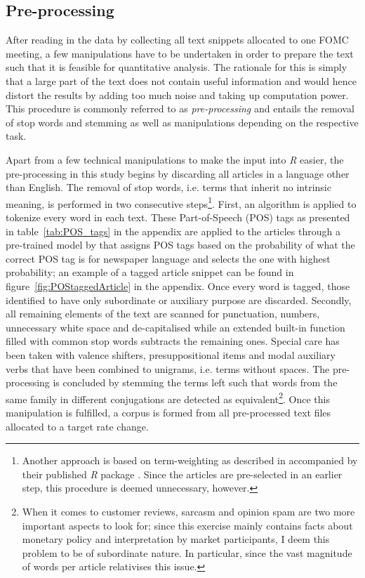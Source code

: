 \subsection{Pre-processing}

After reading in the data by collecting all text snippets allocated to one FOMC meeting, a few manipulations have to be undertaken in order to prepare the text such that it is feasible for quantitative analysis. The rationale for this is simply that a large part of the text does not contain useful information and would hence distort the results by adding too much noise and taking up computation power. This procedure is commonly referred to as \textit{pre-processing} and entails the removal of stop words and stemming as well as manipulations depending on the respective task.

Apart from a few technical manipulations to make the input into \textit{R} easier, the pre-processing in this study begins by discarding all articles in a language other than English. The removal of stop words, i.e. terms that inherit no intrinsic meaning, is performed in two consecutive steps\footnote{Another approach is based on term-weighting as described in \textcite{Silge.2017} accompanied by their published \textit{R} package \textcite{tidytextpackage}. Since the articles are pre-selected in an earlier step, this procedure is deemed unnecessary, however.}. %
First, an algorithm is applied to tokenize every word in each text. These Part-of-Speech (POS) tags as presented in table~\vref{tab:POS_tags} in the appendix are applied to the articles through a pre-trained model by \textcite{OpenNLP.2016} that assigns POS tags based on the probability of what the correct POS tag is for newspaper language and selects the one with highest probability; an example of a tagged article snippet can be found in figure~\vref{fig:POStaggedArticle} in the appendix. Once every word is tagged, those identified to have only subordinate or auxiliary purpose are discarded. Secondly, all remaining elements of the text are scanned for punctuation, numbers, unnecessary white space and de-capitalised while an extended built-in function filled with common stop words subtracts the remaining ones. Special care has been taken with valence shifters, presuppositional items and modal auxiliary verbs that have been combined to unigrams, i.e. terms without spaces. The pre-processing is concluded by stemming the terms left such that words from the same family in different conjugations are detected as equivalent\footnote{When it comes to customer reviews, sarcasm and opinion spam are two more important aspects to look for; since this exercise mainly contains facts about monetary policy and interpretation by market participants, I deem this problem to be of subordinate nature. In particular, since the vast magnitude of words per article relativises this issue.}. Once this manipulation is fulfilled, a corpus is formed from all pre-processed text files allocated to a target rate change. 
